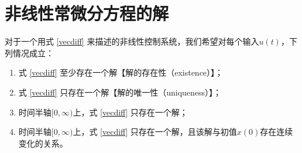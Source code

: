 \section{非线性常微分方程的解}\label{1Cref}

对于一个用式 \eqref{vecdiff} 来描述的非线性控制系统，我们希望对每个输入$u(t)$，下列情况成立：
\begin{enumerate}
  \item 式 \eqref{vecdiff} 至少存在一个解【解的存在性（existence）】；
  \item 式 \eqref{vecdiff} 只存在一个解【解的唯一性（uniqueness）】；
  \item 时间半轴$[0,\infty)$上，式 \eqref{vecdiff} 只存在一个解；
  \item 时间半轴$[0,\infty)$上，式 \eqref{vecdiff} 只存在一个解，且该解与初值$x(0)$存在连续变化的关系。
\end{enumerate}

